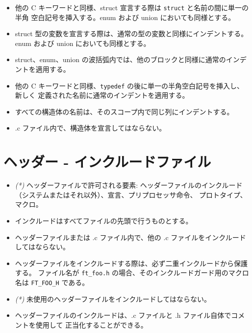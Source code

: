 \documentclass{42-ja}
\begin{document}
\begin{itemize}

\item 他の C キーワードと同様、struct 宣言する際は \texttt{struct} と名前の間に単一の半角
  空白記号を挿入する。enum および union においても同様とする。

\item struct 型の変数を宣言する際は、通常の型の変数と同様にインデントする。enum および union
  においても同様とする。

\item struct、enum、union の波括弧内では、他のブロックと同様に通常のインデントを適用する。

\item 他の C キーワードと同様、\texttt{typedef} の後に単一の半角空白記号を挿入し、新しく
  定義された名前に通常のインデントを適用する。

\item すべての構造体の名前は、そのスコープ内で同じ列にインデントする。

\item .c ファイル内で、構造体を宣言してはならない。

\end{itemize}
\newpage



\section{ヘッダー - インクルードファイル}

\begin{itemize}

    \item \textit{(*)} ヘッダーファイルで許可される要素:
        ヘッダーファイルのインクルード（システムまたはそれ以外）、宣言、プリプロセッサ命令、
        プロトタイプ、マクロ。

    \item インクルードはすべてファイルの先頭で行うものとする。

    \item ヘッダーファイルまたは .c ファイル内で、他の .c ファイルをインクルードしてはならない。

    \item ヘッダーファイルをインクルードする際は、必ず二重インクルードから保護する。
      ファイル名が \texttt{ft\_foo.h} の場合、そのインクルードガード用のマクロ名は 
      \texttt{FT\_FOO\_H} である。

    \item \textit{(*)} 未使用のヘッダーファイルをインクルードしてはならない。

    \item ヘッダーファイルのインクルードは、.c ファイルと .h ファイル自体でコメントを使用して
      正当化することができる。

\end{itemize}
\end{document}
